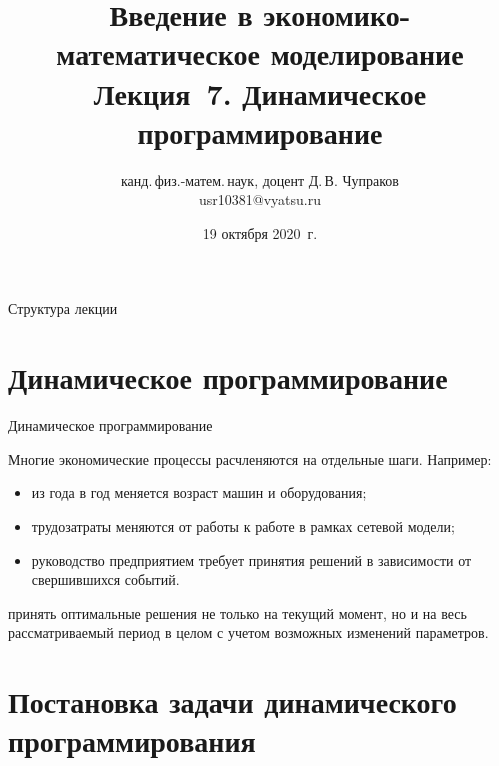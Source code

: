 \documentclass[unicode,11pt,notheorems,xcolor=table]{beamer}
\author[Д.\,В. Чупраков]{канд.\,физ.-матем.\,наук, доцент Д.\,В. Чупраков\\[6pt] usr10381@vyatsu.ru}
\institute[ВятГУ]{ФГБОУ ВО Вятский государственный университет}
\title[Лекция~7. Динамическое программирование]{
	Введение в экономико-математическое моделирование\\[12pt]
	Лекция~7. Динамическое программирование}
\date{19 октября 2020~г.}
\begin{document}
\maketitle

\begin{frame}{Структура лекции}
	\tableofcontents
\end{frame}



\section{Динамическое программирование}
\begin{frame}{Динамическое программирование}{}


	Многие экономические процессы расчленяются на отдельные шаги. 
	Например:
	\begin{itemize}
		\item из года в год меняется возраст машин и оборудования;
		\item трудозатраты меняются от работы к работе в рамках сетевой модели;
		\item руководство предприятием требует принятия решений в зависимости от свершившихся событий. 
	\end{itemize}

 	 принять оптимальные решения не только на текущий момент,  но и на весь рассматриваемый период в целом с учетом возможных изменений параметров. 
 
\end{frame}



\section{Постановка задачи динамического программирования}
\end{document}
